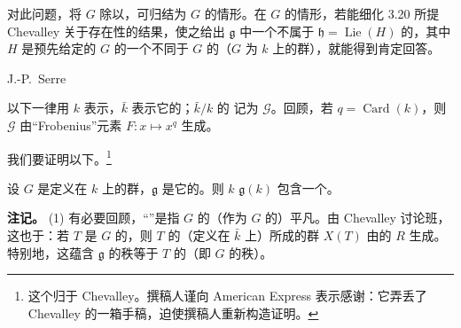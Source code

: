 对此问题，将 $G$ 除以，可归结为 $G$ 的情形。在 $G$ 的情形，若能细化 3.20 所提 Chevalley 关于存在性的结果，使之给出 $\mathfrak g$ 中一个不属于 $\mathfrak h=\operatorname{Lie}(H)$ 的，其中 $H$ 是预先给定的 $G$ 的一个不同于 $G$ 的（$G$ 为 $k$ 上的群），就能得到肯定回答。

\begin{center}J.-P.~Serre\end{center}
以下一律用 $k$ 表示，$\bar k$ 表示它的；$\bar k/k$ 的 记为 $\mathcal G$。回顾，若 $q=\operatorname{Card}(k)$，则 $\mathcal G$ 由“Frobenius”元素 $F:x\mapsto x^q$ 生成。

我们要证明以下。\footnote{这个归于 Chevalley。撰稿人谨向 American Express 表示感谢：它弄丢了 Chevalley 的一箱手稿，迫使撰稿人重新构造证明。}
\begin{SGAresult}{}{}
设 $G$ 是定义在 $k$ 上的群，$\mathfrak g$ 是它的。则 $k$  $\mathfrak g(k)$ 包含一个。
\end{SGAresult}
\textbf{注记。} (1) 有必要回顾，“”是指 $G$ 的（作为 $G$ 的）平凡。由 Chevalley 讨论班，这也于：若 $T$ 是 $G$ 的，则 $T$ 的（定义在 $\bar k$ 上）所成的群 $X(T)$ 由的 $R$ 生成。特别地，这蕴含 $\mathfrak g$ 的秩等于 $T$ 的（即 $G$ 的秩）。

